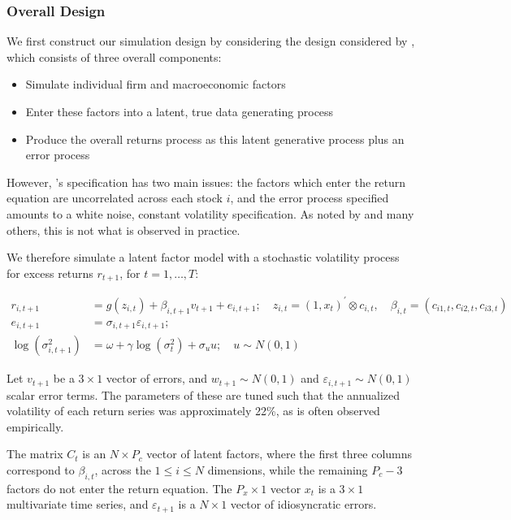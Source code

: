 \documentclass[11pt, a4paper, table]{article}
\begin{document}
\subsubsection{Overall Design}

We first construct our simulation design by considering the design considered by \cite{gu_empirical_2018}, which consists of three overall components:
\begin{itemize}
	\item Simulate individual firm and macroeconomic factors
	\item Enter these factors into a latent, true data generating process
	\item Produce the overall returns process as this latent generative process plus an error process
\end{itemize}

However, \cite{gu_empirical_2018}'s specification has two main issues: the factors which enter the return equation are uncorrelated across each stock $i$, and the error process specified amounts to a white noise, constant volatility specification. As noted by \cite{harvey__2016} and many others, this is not what is observed in practice. 

We therefore simulate a latent factor model with a stochastic volatility process for excess returns  $r_{t+1}$, for $t=1,\dots,T$:

\begin{align}
r_{i, t+1} &= 
g\left(z_{i, t}\right) + \beta_{i,t+1}v_{t+1} + e_{i, t+1}; 
	\quad z_{i, t}=\left(1, x_{t}\right)^{\prime} \otimes c_{i, t}, 
		\quad \beta_{i, t}=\left(c_{i 1, t}, c_{i 2, t}, c_{i 3, t}\right) \\ 
e_{i, t+1} &= 
	\sigma_{i, t+1} \varepsilon_{i, t+1}; \\
\operatorname{log} (\sigma^2_{i,t+1}) &= 
	\omega + \gamma \operatorname{log} (\sigma^2_{t}) + \sigma_{u}u; 
	\quad u \sim N(0, 1)
\end{align}

Let $v_{t+1}$ be a $3\times 1$ vector of errors, and $w_{t+1} \sim N(0, 1)$ and $\varepsilon_{i,t+1} \sim N(0, 1)$ scalar error terms. The parameters of these are tuned such that the annualized volatility of each return series was approximately 22\%, as is often observed empirically.

The matrix $C_t$ is an $N\times P_c$ vector of latent factors, where the first three columns correspond to $\beta_{i,t}$, across the $1\leq i\leq N$ dimensions, while the remaining $P_c-3$ factors do not enter the return equation. The $P_x\times1$ vector $x_t$ is a $3 \times 1$ multivariate time series, and $\varepsilon_{t+1}$ is a $N\times 1$ vector of idiosyncratic errors. 
\end{document}
